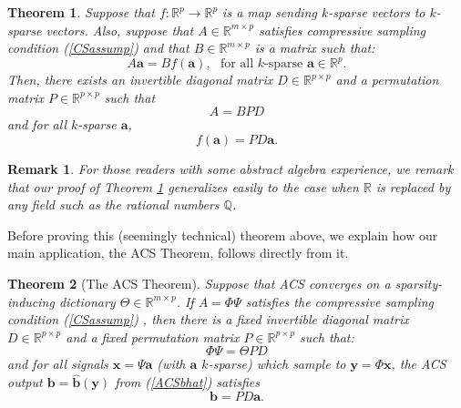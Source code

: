 \documentclass[11pt]{amsart}
\newtheorem{theorem}{Theorem}
\newtheorem{remark}{Remark}
\begin{document}
\begin{theorem}\label{mainHelperThm}
Suppose that $f: \mathbb R^p \to \mathbb R^p$ is a map sending $k$-sparse vectors to $k$-sparse vectors.  Also, suppose that $A \in \mathbb R^{m \times p}$ satisfies compressive sampling condition (\ref{CSassump}) and that $B \in \mathbb R^{m \times p}$ is a matrix such that:
\begin{equation}\label{bhatProperty}
A \mathbf{a} = B f(\mathbf{a}), \ \ \  \text{for all $k$-sparse $\mathbf{a} \in \mathbb R^p$}.
\end{equation}
Then, there exists an invertible diagonal matrix $D \in \mathbb R^{p \times p}$ and a permutation matrix $P \in \mathbb R^{p \times p}$ such that 
\begin{equation}\label{BPDA}
A = BPD %
\end{equation}
and for all $k$-sparse $\mathbf{a}$,
\begin{equation}\label{faPDa}
 f(\mathbf{a})  = PD\mathbf{a}.
\end{equation}
\end{theorem}
\begin{remark}
For those readers with some abstract algebra experience, we remark that our proof of Theorem \ref{mainHelperThm} generalizes easily to the case when $\mathbb R$ is replaced by any field such as the rational numbers $\mathbb Q$.
\end{remark}


Before proving this (seemingly technical) theorem above, we explain how our main application, the ACS Theorem, follows directly from it.

\begin{theorem}[The ACS Theorem]\label{mainPsiRMThm}
Suppose that ACS converges on a sparsity-inducing dictionary $\Theta \in \mathbb R^{m \times p}$.  If $A = \Phi \Psi$ satisfies the compressive sampling condition (\ref{CSassump})%
, then there is a fixed invertible diagonal matrix $D \in \mathbb R^{p \times p}$ and a fixed permutation matrix $P \in \mathbb R^{p \times p}$ such that:  
\begin{equation}\label{thetaeqn}
\Phi \Psi = \Theta P D
\end{equation}
and for all signals $\mathbf{x} = \Psi \mathbf{a}$ (with $\mathbf{a}$ $k$-sparse) which sample to $\mathbf{y} = \Phi \mathbf{x}$, the ACS output $\mathbf{b} = \widehat{\mathbf{b}}(\mathbf{y})$ from (\ref{ACSbhat}) satisfies 
\begin{equation}\label{bintermsofa}
\mathbf{b} = PD  \mathbf{a}.  
\end{equation}
\end{theorem}
\end{document}
